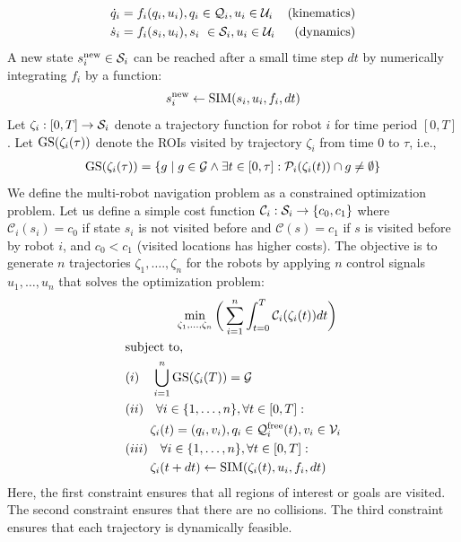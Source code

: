 \documentclass{article}
\begin{document}
\begin{align}
    \dot{q}_i &= f_i(q_i,u_i), q_i \in \mathcal{Q}_i, u_i \in \mathcal{U}_i &\text{(kinematics)} &\label{eq:kinematics}\\
    \dot{s}_i &= f_i(s_i,u_i), s_i \ \in \mathcal{S}_i, u_i \in \mathcal{U}_i &\text{(dynamics)} &\label{eq:dynamics}
\end{align}
A new state $s_i^{\operatorname{new}} \in \mathcal{S}_i$ can be reached after a small time step $dt$ by numerically integrating $f_i$ by a function:
\begin{equation}
    s_i^{\operatorname{new}} \gets \operatorname{SIM}(s_i, u_i, f_i, dt)
\end{equation}
Let $\zeta_i: [0,T] \to \mathcal{S}_i$ denote a trajectory function for robot $i$ for time period $[0,T]$. Let $\operatorname{GS}(\zeta_i(\tau))$ denote the ROIs visited by trajectory $\zeta_i$ from time $0$ to $\tau$, i.e.,
\begin{equation}
\begin{split}
\operatorname{GS}(\zeta_i(\tau)) = \{ g \mid g \in \mathcal{G} \land \exists t \in [0,\tau]: \mathcal{P}_i(\zeta_i(t)) \cap g \neq \emptyset \}
\end{split}
\end{equation}
We define the multi-robot navigation problem as a constrained optimization problem. Let us define a simple cost function $\mathcal{C}_i: \mathcal{S}_i \to \{ c_0, c_1 \}$ where $\mathcal{C}_i(s_i) = c_0$ if state $s_i$ is not visited before and $\mathcal{C}(s) = c_1$ if $s$ is visited before by robot $i$, and $c_0 < c_1$ (visited locations has higher costs). The objective is to generate $n$ trajectories $\zeta_1,\ldots.,\zeta_n$ for the robots by applying $n$ control signals $u_1,\ldots,u_n$ that solves the optimization problem:
\begin{align}
& \qquad \qquad \min_{\zeta_1, \ldots, \zeta_n} \bigg( \sum_{i=1}^{n} \int_{t=0}^{T} \mathcal{C}_i (\zeta_i(t))dt \bigg)   \label{eq:opt} \\
& \textrm{subject to, }    \nonumber \\
& (i) \quad \bigcup_{i=1}^n \operatorname{GS}(\zeta_i(T)) = \mathcal{G}  \label{eq:const1}\\
& (ii) \quad \forall i \in \{1,\ldots,n\}, \forall t \in [0,T]: \nonumber \\
& \qquad \zeta_i(t) = (q_i, v_i), q_i \in \mathcal{Q}_i^{\mathrm{free}}(t), v_i \in \mathcal{V}_i \label{eq:const2}\\
& (iii) \quad \forall i \in \{1,\ldots,n\}, \forall t \in [0,T]: \nonumber \\
& \qquad \zeta_i(t+dt) \gets \operatorname{SIM}( \zeta_i(t), u_i, f_i, dt) \label{eq:const3}
\end{align}
Here, the first constraint ensures that all regions of interest or goals are visited. The second constraint ensures that there are no collisions. The third constraint ensures that each trajectory is dynamically feasible.
\end{document}

